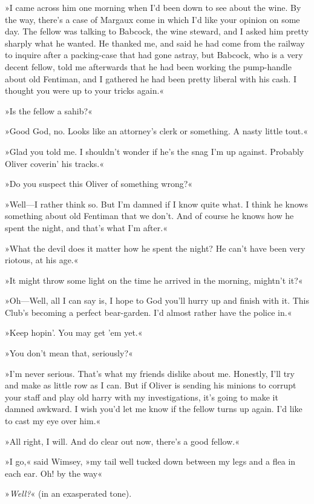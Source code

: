 »I came across him one morning when I'd been down to see about the wine. By the way, there's a case of Margaux come in which I'd like your opinion on some day. The fellow was talking to Babcock, the wine steward, and I asked him pretty sharply what he wanted. He thanked me, and said he had come from the railway to inquire after a packing-case that had gone astray, but Babcock, who is a very decent fellow, told me afterwards that he had been working the pump-handle about old Fentiman, and I gathered he had been pretty liberal with his cash. I thought you were up to your tricks again.«

»Is the fellow a sahib?«

»Good God, no. Looks like an attorney's clerk or something. A nasty little tout.«

»Glad you told me. I shouldn't wonder if he's the snag I'm up against. Probably Oliver coverin' his tracks.«

»Do you suspect this Oliver of something wrong?«

»Well—I rather think so. But I'm damned if I know quite what. I think he knows something about old Fentiman that we don't. And of course he knows how he spent the night, and that's what I'm after.«

»What the devil does it matter how he spent the night? He can't have been very riotous, at his age.«

»It might throw some light on the time he arrived in the morning, mightn't it?«

»Oh—Well, all I can say is, I hope to God you'll hurry up and finish with it. This Club's becoming a perfect bear-garden. I'd almost rather have the police in.«

»Keep hopin'. You may get 'em yet.«

»You don't mean that, seriously?«

»I'm never serious. That's what my friends dislike about me. Honestly, I'll try and make as little row as I can. But if Oliver is sending his minions to corrupt your staff and play old harry with my investigations, it's going to make it damned awkward. I wish you'd let me know if the fellow turns up again. I'd like to cast my eye over him.«

»All right, I will. And do clear out now, there's a good fellow.«

»I go,« said Wimsey, »my tail well tucked down between my legs and a flea in each ear. Oh! by the way\longdash«

»\textit{Well?}« (in an exasperated tone).

